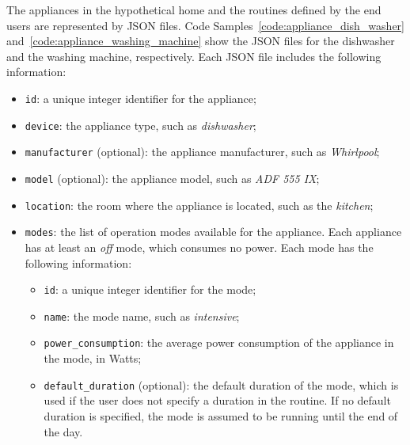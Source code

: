 The appliances in the hypothetical home and the routines defined by the end users are represented by JSON files. Code Samples~\ref{code:appliance_dish_washer} and~\ref{code:appliance_washing_machine} show the JSON files for the dishwasher and the washing machine, respectively. Each JSON file includes the following information:
\begin{itemize}
    \item \texttt{id}: a unique integer identifier for the appliance;
    \item \texttt{device}: the appliance type, such as \textit{dishwasher};
    \item \texttt{manufacturer} (optional): the appliance manufacturer, such as \textit{Whirlpool};
    \item \texttt{model} (optional): the appliance model, such as \textit{ADF 555 IX};
    \item \texttt{location}: the room where the appliance is located, such as the \textit{kitchen};
    \item \texttt{modes}: the list of operation modes available for the appliance. Each appliance has at least an \textit{off} mode, which consumes no power. Each mode has the following information:
    \begin{itemize}
        \item \texttt{id}: a unique integer identifier for the mode;
        \item \texttt{name}: the mode name, such as \textit{intensive};
        \item \texttt{power\_consumption}: the average power consumption of the appliance in the mode, in Watts; 
        \item \texttt{default\_duration} (optional): the default duration of the mode, which is used if the user does not specify a duration in the routine. If no default duration is specified, the mode is assumed to be running until the end of the day.
    \end{itemize}
\end{itemize}





